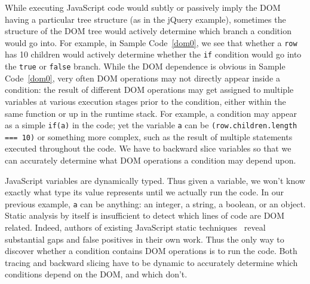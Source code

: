 While executing JavaScript code would subtly or passively imply the DOM having a particular tree structure (as in the jQuery example), sometimes the structure of the DOM tree would actively determine which branch a condition would go into.  
For example, in Sample Code~\ref{dom0}, we see that whether a {\tt row} has 10 children would actively determine whether the {\tt if} condition would go into the {\tt true} or {\tt false} branch.
While the DOM dependence is obvious in Sample Code~\ref{dom0}, very often DOM operations may not directly appear inside a condition: the result of different DOM operations may get assigned to multiple variables at various execution stages prior to the condition, either within the same function or up in the runtime stack.  
For example, a condition may appear as a simple {\tt if(a)} in the code; yet the variable {\tt a} can be {\tt (row.children.length === 10)} or something more complex, such as the result of multiple statements executed throughout the code.  
We have to backward slice variables so that we can accurately determine what DOM operations a condition may depend upon.  


JavaScript variables are dynamically typed.  Thus given a variable, we won't know exactly what type its value represents until we actually run the code.  
In our previous example, {\tt a} can be anything: an integer, a string, a boolean, or an object.  
Static analysis by itself is insufficient to detect which lines of code are DOM related.
Indeed, authors of existing JavaScript static techniques~\cite{staticJsWWW09, staticJsWWW11} reveal substantial gaps and false positives in their own work.  
Thus the only way to discover whether a condition contains DOM operations is to run the code.  Both tracing and backward slicing have to be dynamic to accurately determine which conditions depend on the DOM, and which don't.  


